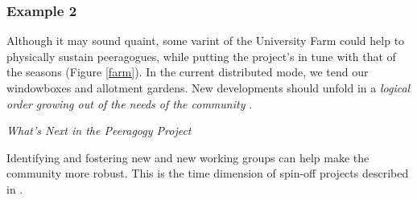 \subsubsection*{Example 2} Although it may sound quaint, some varint of the University Farm  could help to physically
sustain peeragogues, while putting the project's
 in tune with that of the seasons (Figure \ref{farm}).  In the
current distributed mode, we tend our windowboxes and allotment
gardens.  New developments should unfold in a \emph{logical order
  growing out of the needs of the community} \cite[Chapter
  IX]{washington1986up}.

\begin{framed}
\noindent 
\emph{What's Next in the Peeragogy Project}
\begin{collectinmacro}{\HeartbeatWN}{}{}
Identifying and fostering new  and new working groups can help make the community more robust.  This is the time dimension of spin-off projects described in .
\end{collectinmacro}
\HeartbeatWN
\end{framed}


